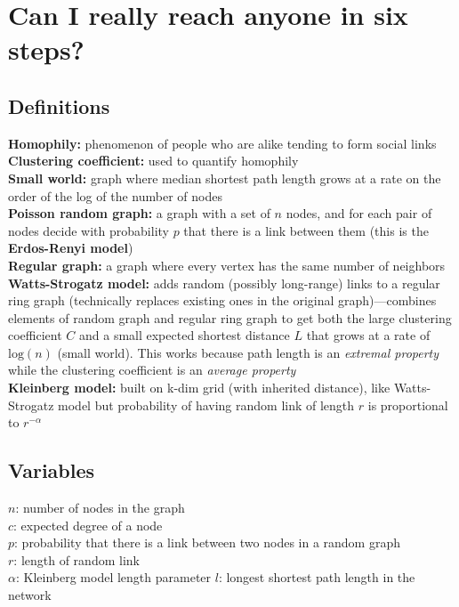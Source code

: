 \documentclass{article}
\begin{document}
\section{Can I really reach anyone in six steps?}

\subsection{Definitions}

\textbf{Homophily:} phenomenon of people who are alike tending to form social links \\
\textbf{Clustering coefficient:} used to quantify homophily \\
\textbf{Small world:} graph where median shortest path length grows at a rate on the order of the log of the number of nodes \\
\textbf{Poisson random graph:} a graph with a set of $n$ nodes, and for each pair of nodes decide with probability $p$ that there is a link between them (this is the \textbf{Erdos-Renyi model}) \\
\textbf{Regular graph:} a graph where every vertex has the same number of neighbors \\
\textbf{Watts-Strogatz model:} adds random (possibly long-range) links to a regular ring graph (technically replaces existing ones in the original graph)---combines elements of random graph and regular ring graph to get both the large clustering coefficient $C$ and a small expected shortest distance $L$ that grows at a rate of $\text{log}(n)$ (small world). This works because path length is an \textit{extremal property} while the clustering coefficient is an \textit{average property} \\
\textbf{Kleinberg model:} built on k-dim grid (with inherited distance), like Watts-Strogatz model but probability of having random link of length $r$ is proportional to $r^{-\alpha}$

\subsection{Variables}

$n$: number of nodes in the graph \\
$c$: expected degree of a node \\
$p$: probability that there is a link between two nodes in a random graph \\
$r$: length of random link \\
$\alpha$: Kleinberg model length parameter
$l$: longest shortest path length in the network
\end{document}
